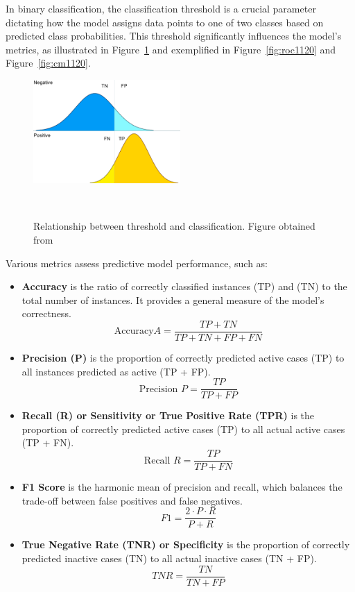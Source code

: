 In binary classification, the classification threshold is a crucial parameter dictating how the model assigns data points to one of two classes based on predicted class probabilities. This threshold significantly influences the model's metrics, as illustrated in Figure~\ref{fig:classification_threshold} and exemplified in Figure~\ref{fig:roc1120} and Figure~\ref{fig:cm1120}.
\begin{figure} 
  \centering
  \includegraphics[width=0.5\textwidth]{figures/classification_threshold.png}
  \caption{Relationship between threshold and classification. Figure obtained from~\cite{wicklin2020}}
~\label{fig:classification_threshold}
\end{figure}

Various metrics assess predictive model performance, such as:

\begin{itemize}
  \item \textbf{Accuracy} is the ratio of correctly classified instances (TP) and (TN) to the total number of instances. It provides a general measure of the model's correctness.
  \[ \text{Accuracy}  A = \frac{TP + TN}{TP + TN + FP + FN} \]

  \item \textbf{Precision (P)} is the proportion of correctly predicted active cases (TP) to all instances predicted as active (TP + FP). 
  \[ \text{Precision } P = \frac{TP}{TP + FP} \]

  \item \textbf{Recall (R) or Sensitivity or True Positive Rate (TPR)} is the proportion of correctly predicted active cases (TP) to all actual active cases (TP + FN).
  \[ \text{Recall } R = \frac{TP}{TP + FN} \]

  \item \textbf{F1 Score} is the harmonic mean of precision and recall, which balances the trade-off between false positives and false negatives.
  \[ F1 = \frac{2 \cdot P \cdot R}{P + R} \]

  \item \textbf{True Negative Rate (TNR) or Specificity} is the proportion of correctly predicted inactive cases (TN) to all actual inactive cases (TN + FP).
  \[ TNR = \frac{TN}{TN + FP} \]

\end{itemize}


